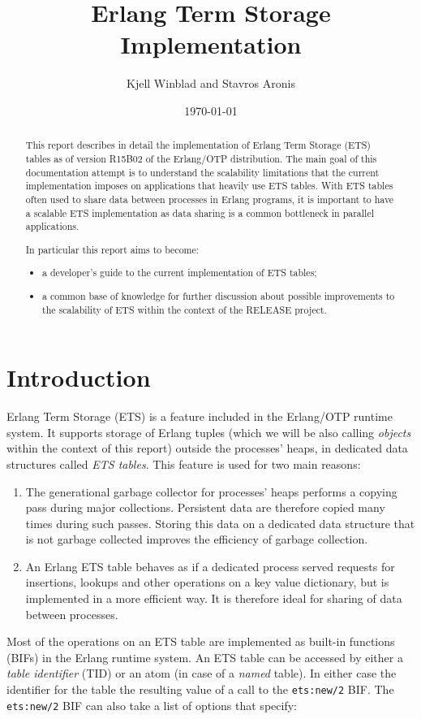 \documentclass[aps,pre,preprint,nofootinbib]{revtex4}
\begin{document}
\title{Erlang Term Storage Implementation}
\author{Kjell Winblad and Stavros Aronis}
\date{\today}


\begin{abstract}

This report describes in detail the implementation of Erlang Term Storage (ETS) tables as of version R15B02 of the Erlang/OTP distribution.
The main goal of this documentation attempt is to understand the scalability limitations that the current implementation imposes on applications that heavily use ETS tables.
With ETS tables often used to share data between processes in Erlang programs, it is important to have a scalable ETS implementation as data sharing is a common bottleneck in parallel applications.

In particular this report aims to become:
\begin{itemize}
\item a developer's guide to the current implementation of ETS tables;
\item a common base of knowledge for further discussion about possible improvements to the scalability of ETS within the context of the RELEASE project.
\end{itemize}

\end{abstract}

\maketitle

\section{Introduction}

Erlang Term Storage (ETS) is a feature included in the Erlang/OTP runtime system.
It supports storage of Erlang tuples (which we will be also calling \emph{objects} within the context of this report) outside the processes' heaps, in dedicated data structures called \emph{ETS tables}.
This feature is used for two main reasons:
\begin{enumerate}
\item The generational garbage collector for processes' heaps performs a copying pass during major collections.
Persistent data are therefore copied many times during such passes. Storing this data on a dedicated data structure that is not garbage collected improves the efficiency of garbage collection.
\item An Erlang ETS table behaves as if a dedicated process served requests for insertions, lookups and other operations on a key value dictionary, but is implemented in a more efficient way.
It is therefore ideal for sharing of data between processes.
\end{enumerate}
Most of the operations on an ETS table are implemented as built-in functions (BIFs) in the Erlang runtime system.
An ETS table can be accessed by either a \emph{table identifier} (TID) or an atom (in case of a \emph{named} table).
In either case the identifier for the table the resulting value of a call to the \verb|ets:new/2| BIF.
The \verb|ets:new/2| BIF can also take a list of options that specify:
\end{document}
